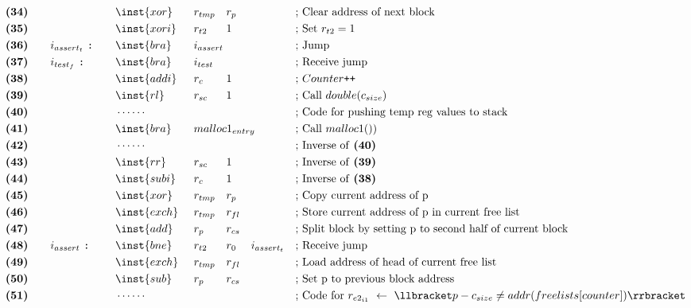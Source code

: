 {\begin{alignat*}{7}
    &\textbf{(34)}\quad&& &&\inst{xor} &&r_{tmp} && r_{p} && && \text{; Clear address of next block}\\
    &\textbf{(35)}\quad&& &&\inst{xori} &&r_{t2} && 1 && && \text{; Set $r_{t2} = 1$}\\
    &\textbf{(36)}\quad&&i_{assert_t}\ \texttt{:}\quad &&\inst{bra} &&i_{assert} \span\omit\span\quad \span\omit\span\quad && \text{; Jump}\\
    &\textbf{(37)}\quad&&i_{test_f}\ \texttt{:}\quad &&\inst{bra} &&i_{test} \span\omit\span\quad \span\omit\span\quad && \text{; Receive jump}\\
    &\textbf{(38)}\quad&& &&\inst{addi} &&r_{c} && 1 && && \text{; $Counter\texttt{++}$}\\
    &\textbf{(39)}\quad&& &&\inst{rl} &&r_{sc}\ && 1 && && \text{; Call $double(c_{size}$)}\\
    &\textbf{(40)}\quad&& &&\cdots\cdots && && && &&\text{; Code for pushing temp reg values to stack}\\
    &\textbf{(41)}\quad&& &&\inst{bra}\quad &&malloc1_{entry} \span\omit\span\quad \span\omit\span\quad && \text{; Call $malloc1()$)}\\
    &\textbf{(42)}\quad&& &&\cdots\cdots && && && &&\text{; Inverse of \textbf{(40)}}\\
    &\textbf{(43)}\quad&& &&\inst{rr} &&r_{sc}\ && 1 && && \text{; Inverse of \textbf{(39)}}\\
    &\textbf{(44)}\quad&& &&\inst{subi} &&r_{c} && 1 && && \text{; Inverse of \textbf{(38)}}\\
    &\textbf{(45)}\quad&& &&\inst{xor} &&r_{tmp} && r_p && && \text{; Copy current address of p}\\
    &\textbf{(46)}\quad&& &&\inst{exch} &&r_{tmp} && r_{fl} && && \text{; Store current address of p in current free list}\\
    &\textbf{(47)}\quad&& &&\inst{add} &&r_{p} && r_{cs} && && \text{; Split block by setting p to second half of current block}\\
    &\textbf{(48)}\quad&&i_{assert}\ \texttt{:}\quad &&\inst{bne} &&r_{t2} && r_0 && i_{assert_t} && \text{; Receive jump}\\
    &\textbf{(49)}\quad&& &&\inst{exch} &&r_{tmp} && r_{fl} && && \text{; Load address of head of current free list}\\
    &\textbf{(50)}\quad&& &&\inst{sub} &&r_{p} && r_{cs} && && \text{; Set p to previous block address}\\
    &\textbf{(51)}\quad&& &&\cdots\cdots && && && &&\text{; Code for $r_{e2_{i1}}\ \leftarrow\ \llbracket p - c_{size} \neq addr(freelists[counter])\rrbracket$}\\

\end{alignat*}}
